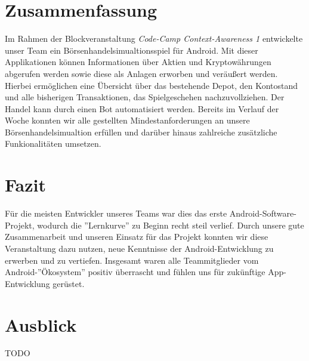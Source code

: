 \documentclass[a4paper]{article}
\begin{document}
\section{Zusammenfassung}
\label{sec:summary}
Im Rahmen der Blockveranstaltung \textit{Code-Camp Context-Awareness 1} entwickelte unser Team ein Börsenhandelsimualtionsspiel für Android. Mit dieser Applikationen können Informationen über Aktien und Kryptowährungen abgerufen werden sowie diese als Anlagen erworben und veräußert werden. Hierbei ermöglichen eine Übersicht über das bestehende Depot, den Kontostand und alle bisherigen Transaktionen, das Spielgeschehen nachzuvollziehen. Der Handel kann durch einen Bot automatisiert werden. \newline
Bereits im Verlauf der Woche konnten wir alle gestellten Mindestanforderungen an unsere Börsenhandelsimualtion erfüllen und darüber hinaus zahlreiche zusätzliche Funkionalitäten umsetzen.


\section{Fazit}
\label{sec:conclusion}
Für die meisten Entwickler unseres Teams war dies das erste Android-Software-Projekt, wodurch die ''Lernkurve'' zu Beginn recht steil verlief. Durch unsere gute Zusammenarbeit und unseren Einsatz für das Projekt konnten wir diese Veranstaltung dazu nutzen, neue Kenntnisse der Android-Entwicklung zu erwerben und zu vertiefen. Insgesamt waren alle Teammitglieder vom Android-''Ökosystem'' positiv überrascht und fühlen uns für zukünftige App-Entwicklung gerüstet.


\section{Ausblick}
\label{sec:outlook}
TODO


\printbibliography[title={Referenzen}]
\end{document}
